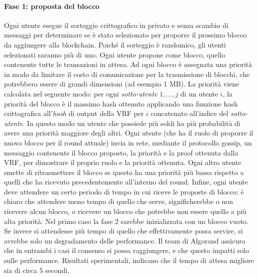 \paragraph*{Fase 1: proposta del blocco}
Ogni utente esegue il sorteggio crittografico in privato e senza scambio di messaggi per determinare se è stato selezionato per proporre il prossimo blocco da aggiungere alla blockchain. Poiché il sorteggio è randomico, gli utenti selezionati saranno più di uno. Ogni utente propone come blocco, quello contenente tutte le transazioni in attesa. Ad ogni blocco è assegnata una priorità in modo da limitare il costo di comunicazione per la trasmissione di blocchi, che potrebbero essere di grandi dimensioni (ad esempio 1 MB). La priorità viene calcolata nel seguente modo: per ogni \emph{sotto-utente} $1, ..., j$ di un utente $i$, la priorità del blocco è il massimo hash ottenuto applicando una funzione hash crittografica all'\emph{hash} di output della VRF per $i$ concatenato all'indice del \emph{sotto-utente}. In questo modo un utente che possiede più soldi ha più probabilità di avere una priorità maggiore degli altri. Ogni utente (che ha il ruolo di proporre il nuovo blocco per il round attuale) invia in rete, mediante il protocollo gossip, un messaggio contenente il blocco proposto, la priorità e la proof ottenuta dalla VRF, per dimostrare il proprio ruolo e la priorità ottenuta. Ogni altro utente smette di ritrasmettere il blocco se questo ha una priorità più bassa rispetto a quelli che ha ricevuto precedentemente all'interno del round. Infine, ogni utente deve attendere un certo periodo di tempo in cui riceve le proposte di blocco: è chiaro che attendere meno tempo di quello che serve, significherebbe o non ricevere alcun blocco, o ricevere un blocco che potrebbe non essere quello a più alta priorità. Nel primo caso la fase 2 sarebbe inizializzata con un blocco vuoto. Se invece si attendesse più tempo di quello che effettivamente possa servire, si avrebbe solo un degradamento delle performance. Il team di Algorand assicura che in entrambi i casi il consenso si possa raggiungere, e che questo impatti solo sulle performance. Risultati sperimentali, indicano che il tempo di attesa migliore sia di circa 5 secondi.

